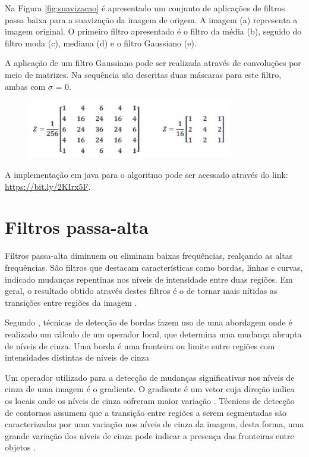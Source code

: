 \documentclass[
	12pt,				%
	oneside,			%
	a4paper,			%
	english,			%
	french,				%
	spanish,			%
	brazil,				%
	]{abntex2}
\begin{document}
Na Figura \ref{fig:suavizacao} é apresentado um conjunto de aplicações de filtros passa baixa para a suavização da imagem de origem. A imagem (a) representa a imagem original.  O primeiro filtro apresentado é o filtro da média (b), seguido do filtro moda (c), mediana (d) e o filtro Gaussiano (e).

A aplicação de um filtro Gaussiano pode ser realizada através de convoluções por meio de matrizes. Na sequência são descritas duas máscaras para este filtro, ambas com \(\sigma\) = 0.

\begin{figure}[ht]
\centering
\includegraphics[width=0.8\textwidth]{imagens/gauss_mascara.png}
\end{figure}


A implementação em java para o algoritmo pode ser acessado através do link: \url{https://bit.ly/2KIrx5F}.

\section{Filtros passa-alta}
\label{sec:passaAlta}

Filtros passa-alta diminuem ou eliminam baixas frequências, realçando as altas frequências. São filtros que destacam características como bordas, linhas e curvas, indicado mudanças repentinas nos níveis de intensidade entre duas regiões. Em geral, o resultado obtido através destes filtros é o de tornar mais nítidas as transições entre regiões da imagem \cite{conciAzevedoLeta:2008}.

Segundo \citet{pedriniSchwartz:2008}, técnicas de detecção de bordas fazem uso de uma abordagem onde é realizado um cálculo de um operador local, que determina uma mudança abrupta de níveis de cinza. Uma borda é uma fronteira ou limite entre regiões com intensidades distintas de níveis de cinza

Um operador utilizado para a detecção de mudanças significativas nos níveis de cinza de uma imagem é o gradiente. O gradiente é um vetor cuja direção indica os locais onde os níveis de cinza sofreram maior variação \cite{pedriniSchwartz:2008}. Técnicas de detecção de contornos assumem que a transição entre regiões a serem segmentadas são caracterizadas por uma variação nos níveis de cinza da imagem, desta forma, uma grande variação dos níveis de cinza pode indicar a presença das fronteiras entre objetos \cite{conciAzevedoLeta:2008}. 
\end{document}
